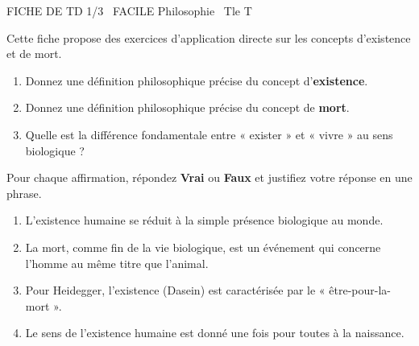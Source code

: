 \documentclass[11pt]{article}
\begin{document}
\begin{tcolorbox}[enhanced,colback=popink,colframe=popink,arc=10pt,boxrule=0pt,left=12pt,right=12pt,top=9pt,bottom=9pt]
{\color{white}\popxbold\small FICHE DE TD 1/3 \textbullet\ FACILE \hfill Philosophie \textbullet\ Tle T\par}
\end{tcolorbox}
\vspace{4pt}
Cette fiche propose des exercices d'application directe sur les concepts d'existence et de mort.

\begin{exercice}
\begin{enumerate}
    \item Donnez une définition philosophique précise du concept d'\textbf{existence}.
    \item Donnez une définition philosophique précise du concept de \textbf{mort}.
    \item Quelle est la différence fondamentale entre « exister » et « vivre » au sens biologique ?
\end{enumerate}
\end{exercice}

\begin{exercice}
Pour chaque affirmation, répondez \textbf{Vrai} ou \textbf{Faux} et justifiez votre réponse en une phrase.
\begin{enumerate}
    \item L'existence humaine se réduit à la simple présence biologique au monde.
    \item La mort, comme fin de la vie biologique, est un événement qui concerne l'homme au même titre que l'animal.
    \item Pour Heidegger, l'existence (Dasein) est caractérisée par le « être-pour-la-mort ».
    \item Le sens de l'existence humaine est donné une fois pour toutes à la naissance.
\end{enumerate}
\end{exercice}
\end{document}
